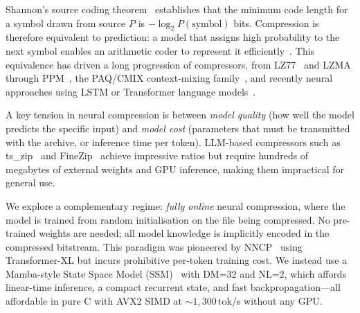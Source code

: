 \documentclass[10pt,twocolumn]{article}
\begin{document}
Shannon's source coding theorem~\citep{shannon1948} establishes that the
minimum code length for a symbol drawn from source $P$ is
$-\log_2 P(\text{symbol})$ bits.  Compression is therefore equivalent
to prediction: a model that assigns high probability to the next symbol
enables an arithmetic coder to represent it efficiently~\citep{rissanen1979}.
This equivalence has driven a long progression of compressors, from
LZ77~\citep{ziv1977} and LZMA through PPM~\citep{cleary1984}, the
PAQ/CMIX context-mixing family~\citep{mahoney2005,cmix2024}, and
recently neural approaches using LSTM or Transformer language
models~\citep{bellard2021,deletang2024,huang2024finezip}.

A key tension in neural compression is between \emph{model quality}
(how well the model predicts the specific input) and \emph{model cost}
(parameters that must be transmitted with the archive, or inference
time per token).  LLM-based compressors such as ts\_zip~\citep{bellard2023}
and FineZip~\citep{huang2024finezip} achieve impressive ratios but require
hundreds of megabytes of external weights and GPU inference, making them
impractical for general use.

We explore a complementary regime: \emph{fully online} neural
compression, where the model is trained from random initialisation
on the file being compressed.  No pre-trained weights are needed;
all model knowledge is implicitly encoded in the compressed bitstream.
This paradigm was pioneered by NNCP~\citep{bellard2021} using
Transformer-XL but incurs prohibitive per-token training cost.  We
instead use a Mamba-style State Space Model (SSM)~\citep{gu2023mamba}
with DM=32 and NL=2, which affords linear-time inference, a compact
recurrent state, and fast backpropagation---all affordable in pure C
with AVX2 SIMD at ${\sim}1{,}300$\,tok/s without any GPU.
\end{document}
